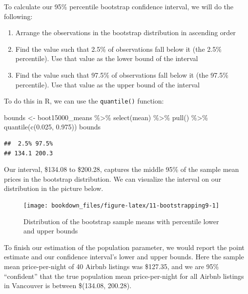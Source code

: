 \documentclass[
]{krantz}
\makeatletter
\newenvironment{Shaded}{\begin{snugshade}}{\end{snugshade}}
\newcommand{\FloatTok}[1]{\textcolor[rgb]{0.06,0.06,0.06}{#1}}
\newcommand{\FunctionTok}[1]{\textcolor[rgb]{0,0,0}{#1}}
\newcommand{\NormalTok}[1]{#1}
\newcommand{\OtherTok}[1]{\textcolor[rgb]{0.37,0.37,0.37}{#1}}
\newcommand{\SpecialCharTok}[1]{\textcolor[rgb]{0,0,0}{#1}}
\providecommand{\tightlist}{%
  \setlength{\itemsep}{0pt}\setlength{\parskip}{0pt}}
\newenvironment{kframe}{%
\medskip{}
\setlength{\fboxsep}{.8em}
 \def\at@end@of@kframe{}%
 \ifinner\ifhmode%
  \def\at@end@of@kframe{\end{minipage}}%
  \begin{minipage}{\columnwidth}%
 \fi\fi%
 \def\FrameCommand##1{\hskip\@totalleftmargin \hskip-\fboxsep
 \colorbox{shadecolor}{##1}\hskip-\fboxsep
     \hskip-\linewidth \hskip-\@totalleftmargin \hskip\columnwidth}%
 \MakeFramed {\advance\hsize-\width
   \@totalleftmargin\z@ \linewidth\hsize
   \@setminipage}}%
 {\par\unskip\endMakeFramed%
 \at@end@of@kframe}
\renewenvironment{Shaded}{\begin{kframe}}{\end{kframe}}
\makeatother
\begin{document}
To calculate our 95\% percentile bootstrap confidence interval, we will do the following:

\begin{enumerate}
\def\labelenumi{\arabic{enumi}.}
\tightlist
\item
  Arrange the observations in the bootstrap distribution in ascending order
\item
  Find the value such that 2.5\% of observations fall below it (the 2.5\% percentile). Use that value as the lower bound of the interval
\item
  Find the value such that 97.5\% of observations fall below it (the 97.5\% percentile). Use that value as the upper bound of the interval
\end{enumerate}

To do this in R, we can use the \texttt{quantile()} function:

\begin{Shaded}
\begin{Highlighting}[]
\NormalTok{bounds }\OtherTok{\textless{}{-}}\NormalTok{ boot15000\_means }\SpecialCharTok{\%\textgreater{}\%}
  \FunctionTok{select}\NormalTok{(mean) }\SpecialCharTok{\%\textgreater{}\%}
  \FunctionTok{pull}\NormalTok{() }\SpecialCharTok{\%\textgreater{}\%}
  \FunctionTok{quantile}\NormalTok{(}\FunctionTok{c}\NormalTok{(}\FloatTok{0.025}\NormalTok{, }\FloatTok{0.975}\NormalTok{))}
\NormalTok{bounds}
\end{Highlighting}
\end{Shaded}

\begin{verbatim}
##  2.5% 97.5% 
## 134.1 200.3
\end{verbatim}

Our interval, \$134.08 to \$200.28, captures the middle 95\% of the sample mean prices in the bootstrap distribution. We can visualize the interval on our distribution in the picture below.

\begin{figure}
\texttt{[image: bookdown\_files/figure-latex/11-bootstrapping9-1]} \caption{Distribution of the bootstrap sample means with percentile lower and upper bounds}\label{fig:11-bootstrapping9}
\end{figure}

To finish our estimation of the population parameter, we would report the point estimate and our confidence interval's lower and upper bounds. Here the sample mean price-per-night of 40 Airbnb listings was \$127.35, and we are 95\% ``confident'' that the true population mean price-per-night for all Airbnb listings in Vancouver is between \$(134.08, 200.28).
\end{document}
